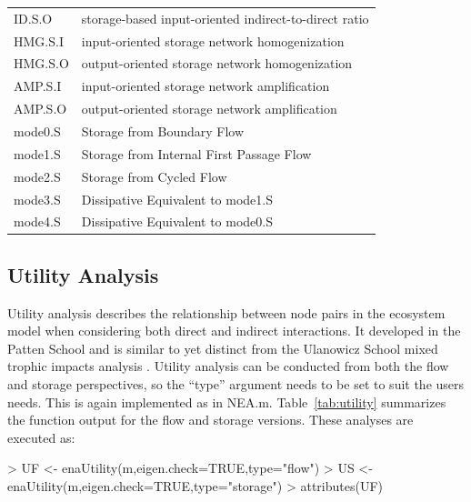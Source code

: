 \documentclass[11pt]{article}
\begin{document}
\begin{table}[]
\begin{small}
\begin{tabular}{l l}
      ID.S.O & storage-based input-oriented indirect-to-direct ratio \citep[as in][]{fath06}\\
      HMG.S.I & input-oriented storage network homogenization \\
      HMG.S.O & output-oriented storage network homogenization\\ 
      AMP.S.I &  input-oriented storage network amplification \\
      AMP.S.O & output-oriented storage network amplification \\
      mode0.S & Storage from Boundary Flow \\
      mode1.S & Storage from Internal First Passage Flow \\
      mode2.S & Storage from Cycled Flow \\
      mode3.S & Dissipative Equivalent to mode1.S \\
      mode4.S & Dissipative Equivalent to mode0.S \\ \hline
    \end{tabular}
\end{small}
\end{table}  

\subsection{Utility Analysis}
Utility analysis describes the relationship between node pairs in the
ecosystem model when considering both direct and indirect
interactions.  It developed in the Patten School \citep{patten91,
  fath99_review} and is similar to yet distinct from the Ulanowicz
School mixed trophic impacts analysis \citep{ulanowicz90}.  Utility
analysis can be conducted from both the flow and storage perspectives,
so the ``type'' argument needs to be set to suit the users needs.
This is again implemented as in NEA.m.  Table~\ref{tab:utility}
summarizes the function output for the flow and storage
versions. These analyses are executed as:

\begin{Schunk}
\begin{Sinput}
> UF <- enaUtility(m,eigen.check=TRUE,type="flow")  
> US <- enaUtility(m,eigen.check=TRUE,type="storage")  
> attributes(UF)
\end{Sinput}
\end{Schunk}
\end{document}
